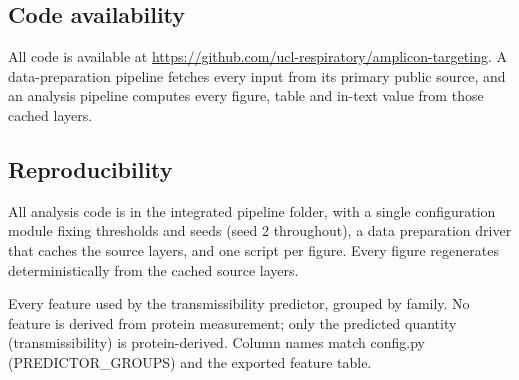 \documentclass[times, twoside]{zHenriquesLab-StyleBioRxiv}
\begin{document}
\subsection*{Code availability}
All code is available at \url{https://github.com/ucl-respiratory/amplicon-targeting}. A data-preparation pipeline fetches every input from its primary public source, and an analysis pipeline computes every figure, table and in-text value from those cached layers.

\subsection*{Reproducibility}
All analysis code is in the integrated pipeline folder, with a single configuration module fixing thresholds and seeds (seed 2 throughout), a data preparation driver that caches the source layers, and one script per figure. Every figure regenerates deterministically from the cached source layers.

Every feature used by the transmissibility predictor, grouped by family. No feature is derived from protein measurement; only the predicted quantity (transmissibility) is protein-derived. Column names match config.py (PREDICTOR\_GROUPS) and the exported feature table.
\end{document}
